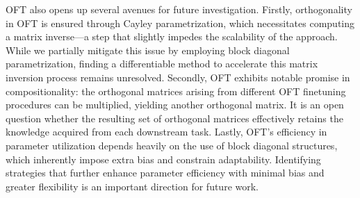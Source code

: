 OFT also opens up several avenues for future investigation. Firstly, orthogonality in OFT is ensured through Cayley parametrization, which necessitates computing a matrix inverse—a step that slightly impedes the scalability of the approach. While we partially mitigate this issue by employing block diagonal parametrization, finding a differentiable method to accelerate this matrix inversion process remains unresolved. Secondly, OFT exhibits notable promise in compositionality: the orthogonal matrices arising from different OFT finetuning procedures can be multiplied, yielding another orthogonal matrix. It is an open question whether the resulting set of orthogonal matrices effectively retains the knowledge acquired from each downstream task. Lastly, OFT’s efficiency in parameter utilization depends heavily on the use of block diagonal structures, which inherently impose extra bias and constrain adaptability. Identifying strategies that further enhance parameter efficiency with minimal bias and greater flexibility is an important direction for future work.

